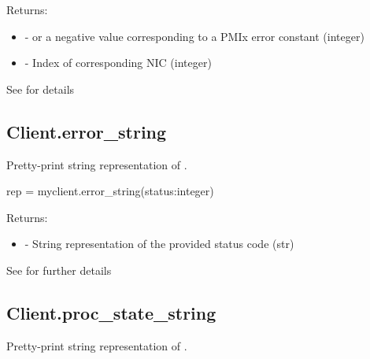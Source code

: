 \begin{arglist}
\end{arglist}

Returns:

\begin{itemize}
    \item {} -  or a negative value corresponding to a PMIx error constant (integer)
    \item {} - Index of corresponding \ac{NIC} (integer)
\end{itemize}


See  for details


\subsection{Client.error_string}

\summary

Pretty-print string representation of .

\format

\pyspecificstart
\begin{codepar}
rep = myclient.error_string(status:integer)
\end{codepar}
\pyspecificend

\begin{arglist}
\end{arglist}

Returns:
\begin{itemize}
    \item {} - String representation of the provided status code (str)
\end{itemize}

See  for further details


\subsection{Client.proc_state_string}

\summary

Pretty-print string representation of .

